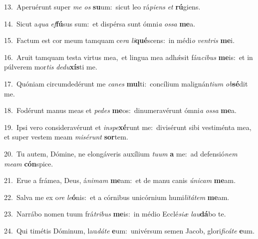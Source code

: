 {\numbfont\textcolor{\numbcolor}{13.}}~Aperuérunt super \textit{me} \textit{os} \textbf{su}\-um:~\star sicut leo rá\-\textit{pi}\-\textit{ens} \textit{et} \textbf{rú}\-giens.\par
{\numbfont\textcolor{\numbcolor}{14.}}~Sicut a\textit{qua} \textit{ef}\-\textbf{fú}sus sum:~\star et dispérsa sunt ómni\textit{a} \textit{os}\-\textit{sa} \textbf{me}\-a.\par
{\numbfont\textcolor{\numbcolor}{15.}}~Factum est cor meum tamquam ce\textit{ra} \textit{li}\-\textbf{qué}scens:~\star in médi\textit{o} \textit{ven}\-\textit{tris} \textbf{me}\-i.\par
{\numbfont\textcolor{\numbcolor}{16.}}~Aruit tamquam testa virtus mea,~\dagger et lingua mea adhǽsit fáu\-\textit{ci}\-\textit{bus} \textbf{me}\-is:~\star et in púlverem mor\textit{tis} \textit{de}\-\textit{du}\textbf{xís}ti me.\par
{\numbfont\textcolor{\numbcolor}{17.}}~Quóniam circumdedérunt me \textit{ca}\-\textit{nes} \textbf{mul}\-ti:~\star concílium malignán\-\textit{ti}\-\textit{um} \textit{ob}\-\textbf{sé}dit me.\par
{\numbfont\textcolor{\numbcolor}{18.}}~Fodérunt manus meas et \textit{pe}\-\textit{des} \textbf{me}\-os:~\star dinumeravérunt ómni\textit{a} \textit{os}\-\textit{sa} \textbf{me}\-a.\par
{\numbfont\textcolor{\numbcolor}{19.}}~Ipsi vero consideravérunt et \textit{in}\-\textit{spe}\textbf{xé}runt me:~\star divisérunt sibi vestiménta mea, et super vestem meam \textit{mi}\-\textit{sé}\textit{runt} \textbf{sor}\-tem.\par
{\numbfont\textcolor{\numbcolor}{20.}}~Tu autem, Dómine, ne elongáveris auxílium \textit{tu}\-\textit{um} \textbf{a} me:~\star ad defensió\textit{nem} \textit{me}\-\textit{am} \textbf{cón}\-spice.\par
{\numbfont\textcolor{\numbcolor}{21.}}~Erue a frámea, Deus, á\-\textit{ni}\-\textit{mam} \textbf{me}\-am:~\star et de manu canis \textit{ú}\-\textit{ni}\textit{cam} \textbf{me}\-am.\par
{\numbfont\textcolor{\numbcolor}{22.}}~Salva me ex o\textit{re} \textit{le}\-\textbf{ó}nis:~\star et a córnibus unicórnium humi\-\textit{li}\-\textit{tá}\textit{tem} \textbf{me}\-am.\par
{\numbfont\textcolor{\numbcolor}{23.}}~Narrábo nomen tuum frá\-\textit{tri}\-\textit{bus} \textbf{me}\-is:~\star in médio Ecclé\-\textit{si}\-\textit{æ} \textit{lau}\-\textbf{dá}bo te.\par
{\numbfont\textcolor{\numbcolor}{24.}}~Qui timétis Dóminum, lau\-\textit{dá}\-\textit{te} \textbf{e}\-um:~\star univérsum semen Jacob, glori\-\textit{fi}\-\textit{cá}\textit{te} \textbf{e}\-um.\par

